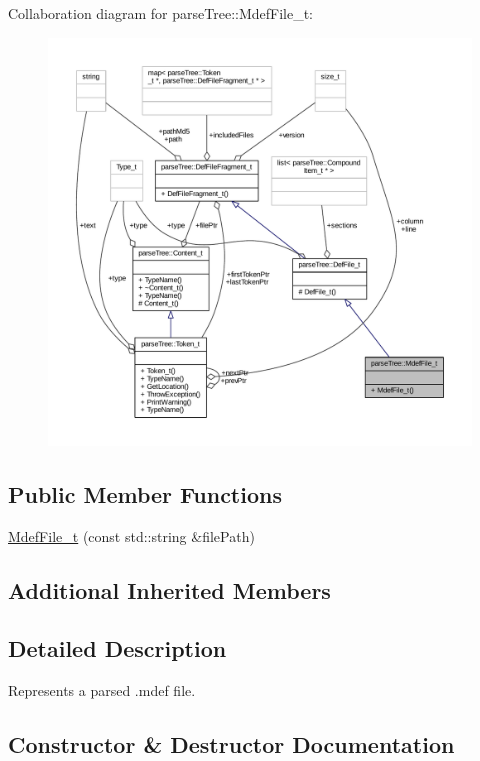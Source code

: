 Collaboration diagram for parse\+Tree\+:\+:Mdef\+File\+\_\+t\+:
\nopagebreak
\begin{figure}[H]
\begin{center}
\leavevmode
\includegraphics[width=350pt]{structparse_tree_1_1_mdef_file__t__coll__graph}
\end{center}
\end{figure}
\subsection*{Public Member Functions}
\begin{DoxyCompactItemize}
\item 
\hyperlink{structparse_tree_1_1_mdef_file__t_a4753e7ebab1a6334009f752a401069e1}{Mdef\+File\+\_\+t} (const std\+::string \&file\+Path)
\end{DoxyCompactItemize}
\subsection*{Additional Inherited Members}


\subsection{Detailed Description}
Represents a parsed .mdef file. 

\subsection{Constructor \& Destructor Documentation}
